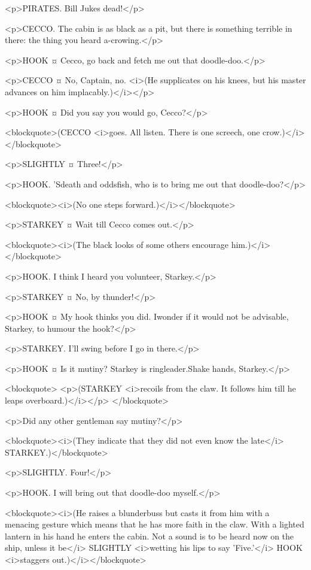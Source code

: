 <p>PIRATES. Bill Jukes dead!</p>

<p>CECCO. The cabin is as black as a pit, but there is something terrible in there: the thing you heard a-crowing.</p>

<p>HOOK ¤
Cecco, go back and fetch me out that doodle-doo.</p>

<p>CECCO ¤
No, Captain, no. <i>(He supplicates on his knees, but his master advances on him implacably.)</i></p>

<p>HOOK ¤
Did you say you would go, Cecco?</p>

<blockquote>(CECCO <i>goes. All listen. There is one screech, one crow.)</i></blockquote>

<p>SLIGHTLY ¤
Three!</p>

<p>HOOK. 'Sdeath and oddsfish, who is to bring me out that doodle-doo?</p>

<blockquote><i>(No one steps forward.)</i></blockquote>

<p>STARKEY ¤
Wait till Cecco comes out.</p>

<blockquote><i>(The black looks of some others encourage him.)</i></blockquote>

<p>HOOK. I think I heard you volunteer, Starkey.</p>

<p>STARKEY ¤
No, by thunder!</p>

<p>HOOK ¤
My hook thinks you did. Iwonder if it would not be advisable, Starkey, to humour the hook?</p>

<p>STARKEY. I'll swing before I go in there.</p>

<p>HOOK ¤
Is it mutiny? Starkey is ringleader.Shake hands, Starkey.</p>

<blockquote> <p>(STARKEY <i>recoils from the claw. It follows him till he leaps overboard.)</i></p> </blockquote>

<p>Did any other gentleman say mutiny?</p>

<blockquote><i>(They indicate that they did not even know the late</i> STARKEY.)</blockquote>

<p>SLIGHTLY. Four!</p>

<p>HOOK. I will bring out that doodle-doo myself.</p>

<blockquote><i>(He raises a blunderbuss but casts it from him with a menacing gesture which means that he has more faith in the claw. With a lighted lantern in his hand he enters the cabin. Not a sound is to be heard now on the ship, unless it be</i> SLIGHTLY <i>wetting his lips to say 'Five.'</i> HOOK <i>staggers out.)</i></blockquote>

